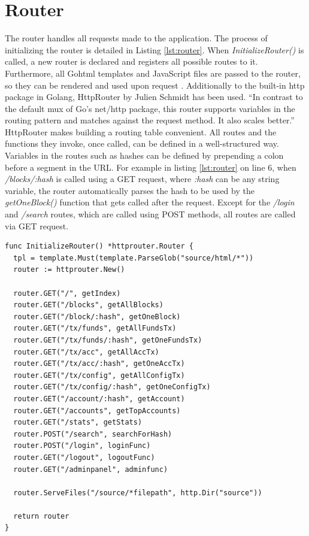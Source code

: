 \section{Router} \label{router}
The router handles all requests made to the application. The process of initializing the router is detailed in Listing \ref{lst:router}. When \emph{InitializeRouter()} is called, a new router is declared and registers all possible routes to it. Furthermore, all Gohtml templates and JavaScript files are passed to the router, so they can be rendered and used upon request \cite{httppackage}. 
Additionally to the built-in http package in Golang, HttpRouter by Julien Schmidt \cite{httprouter} has been used. 
``In contrast to the default mux of Go's net/http package, this router supports variables in the routing pattern and matches against the request method. It also scales better.'' \cite{httprouter}
HttpRouter makes building a routing table convenient. All routes and the functions they invoke, once called, can be defined in a well-structured way. Variables in the routes such as hashes can be defined by prepending a colon before a segment in the URL. For example in listing \ref{lst:router} on line 6, when \emph{/blocks/:hash} is called using a GET request, where \emph{:hash} can be any string variable, the router automatically parses the hash to be used by the \emph{getOneBlock()} function that gets called after the request. Except for the \emph{/login} and \emph{/search} routes, which are called using POST methods, all routes are called via GET request.
\newpage
\begin{lstlisting}[caption={Initialization of the Router},captionpos=b,label={lst:router}]
func InitializeRouter() *httprouter.Router {
  tpl = template.Must(template.ParseGlob("source/html/*"))
  router := httprouter.New()

  router.GET("/", getIndex)
  router.GET("/blocks", getAllBlocks)
  router.GET("/block/:hash", getOneBlock)
  router.GET("/tx/funds", getAllFundsTx)
  router.GET("/tx/funds/:hash", getOneFundsTx)
  router.GET("/tx/acc", getAllAccTx)
  router.GET("/tx/acc/:hash", getOneAccTx)
  router.GET("/tx/config", getAllConfigTx)
  router.GET("/tx/config/:hash", getOneConfigTx)
  router.GET("/account/:hash", getAccount)
  router.GET("/accounts", getTopAccounts)
  router.GET("/stats", getStats)
  router.POST("/search", searchForHash)
  router.POST("/login", loginFunc)
  router.GET("/logout", logoutFunc)
  router.GET("/adminpanel", adminfunc)

  router.ServeFiles("/source/*filepath", http.Dir("source"))

  return router
}
\end{lstlisting}

